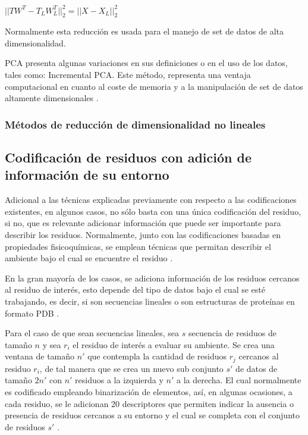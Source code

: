 \begin{center}
	$|| TW^{T} - T_{L}W_{L}^{T}||^{2}_{2} = ||X - X_{L}||_{2}^{2}$
\end{center}

Normalmente esta reducción es usada para el manejo de set de datos de alta dimensionalidad.

PCA presenta algunas variaciones en sus definiciones o en el uso de los datos, tales como: Incremental PCA. Este método, representa una ventaja computacional en cuanto al coste de memoria y a la manipulación de set de datos altamente dimensionales \cite{artac2002incremental}.


\subsubsection{Métodos de reducción de dimensionalidad no lineales}


\subsection{Codificación de residuos con adición de información de su entorno}

Adicional a las técnicas explicadas previamente con respecto a las codificaciones existentes, en algunos casos, no sólo basta con una única codificación del residuo, si no, que es relevante adicionar información que puede ser importante para describir los residuos. Normalmente, junto con las codificaciones basadas en propiedades fisicoquímicas, se emplean técnicas que permitan describir el ambiente bajo el cual se encuentre el residuo \cite{masso2008accurate}.

En la gran mayoría de los casos, se adiciona información de los residuos cercanos al residuo de interés, esto depende del tipo de datos bajo el cual se esté trabajando, es decir, si son secuencias lineales o son estructuras de proteínas en formato PDB \cite{capriotti2008three, capriotti2005mutant2}. 

Para el caso de que sean secuencias lineales, sea $s$ secuencia de residuos de tamaño $n$ y sea $r_{i}$ el residuo de interés a evaluar su ambiente. Se crea una ventana de tamaño $n'$ que contempla la cantidad de residuos $r_j$ cercanos al residuo $r_{i}$, de tal manera que se crea un nuevo sub conjunto $s'$ de datos de tamaño $2n'$ con $n'$ residuos a la izquierda y $n'$ a la derecha. El cual normalmente es codificado empleando binarización de elementos, así, en algunas ocasiones, a cada residuo, se le adicionan 20 descriptores que permiten indicar la ausencia o presencia de residuos cercanos a su entorno y el cual se completa con el conjunto de residuos $s'$ \cite{capriotti2008three}.

